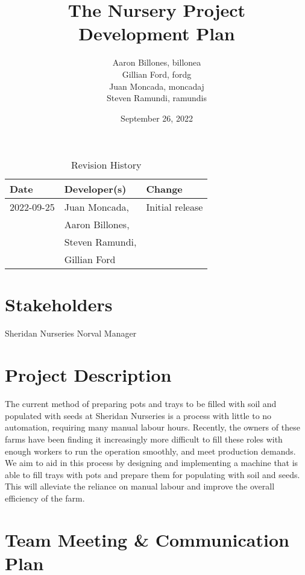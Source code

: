 \documentclass{article}
\title{The Nursery Project\\ Development Plan}
\author{Aaron Billones, billonea\\Gillian Ford, fordg\\Juan Moncada, moncadaj\\Steven Ramundi, ramundis}
\date{September 26, 2022}
\begin{document}
\maketitle

\begin{table}[hp]
	\caption{Revision History} \label{TblRevisionHistory}
	\begin{tabularx}{\textwidth}{llX}
	\toprule
	\textbf{Date} & \textbf{Developer(s)} & \textbf{Change}\\
	\midrule
	2022-09-25 & Juan Moncada,& Initial release\\&Aaron Billones,\\&Steven Ramundi,\\&Gillian Ford \\
	\bottomrule
	\end{tabularx}
	\end{table}

	\newpage
	
	\section{Stakeholders}
	Sheridan Nurseries Norval Manager
	
	\section{Project Description} 
	The current method of preparing pots and trays to be filled with soil and populated with seeds at Sheridan Nurseries is a process with little to no automation, requiring many manual labour hours. Recently, the owners of these farms have been finding it increasingly more difficult to fill these roles with enough workers to run the operation smoothly, and meet production demands. We aim to aid in this process by designing and implementing a machine that is able to fill trays with pots and prepare them for populating with soil and seeds. This will alleviate the reliance on manual labour and improve the overall efficiency of the farm.

	\section{Team Meeting \& Communication Plan}
	
\end{document}
